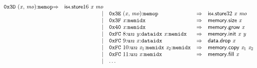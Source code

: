$$\begin{array}{@{}l@{}rrlll@{}l@{}}
\mathtt{0x3D}~({\mathit{x}},\, {\mathit{mo}}){:}{\mathtt{memop}} &\Rightarrow& {\mathsf{i{\scriptstyle64}}.\mathsf{store}}{16}~{\mathit{x}}~{\mathit{mo}} \\ &&|&
\mathtt{0x3E}~({\mathit{x}},\, {\mathit{mo}}){:}{\mathtt{memop}} &\Rightarrow& {\mathsf{i{\scriptstyle64}}.\mathsf{store}}{32}~{\mathit{x}}~{\mathit{mo}} \\ &&|&
\mathtt{0x3F}~{\mathit{x}}{:}{\mathtt{memidx}} &\Rightarrow& \mathsf{memory.size}~{\mathit{x}} \\ &&|&
\mathtt{0x40}~{\mathit{x}}{:}{\mathtt{memidx}} &\Rightarrow& \mathsf{memory.grow}~{\mathit{x}} \\ &&|&
\mathtt{0xFC}~8{:}{\mathtt{u{\scriptstyle32}}}~{\mathit{y}}{:}{\mathtt{dataidx}}~{\mathit{x}}{:}{\mathtt{memidx}} &\Rightarrow& \mathsf{memory.init}~{\mathit{x}}~{\mathit{y}} \\ &&|&
\mathtt{0xFC}~9{:}{\mathtt{u{\scriptstyle32}}}~{\mathit{x}}{:}{\mathtt{dataidx}} &\Rightarrow& \mathsf{data.drop}~{\mathit{x}} \\ &&|&
\mathtt{0xFC}~10{:}{\mathtt{u{\scriptstyle32}}}~{\mathit{x}}_{{1}}{:}{\mathtt{memidx}}~{\mathit{x}}_{{2}}{:}{\mathtt{memidx}} &\Rightarrow& \mathsf{memory.copy}~{\mathit{x}}_{{1}}~{\mathit{x}}_{{2}} \\ &&|&
\mathtt{0xFC}~11{:}{\mathtt{u{\scriptstyle32}}}~{\mathit{x}}{:}{\mathtt{memidx}} &\Rightarrow& \mathsf{memory.fill}~{\mathit{x}} \\ &&|&
\dots \\
\end{array}
$$

\vspace{1ex}

